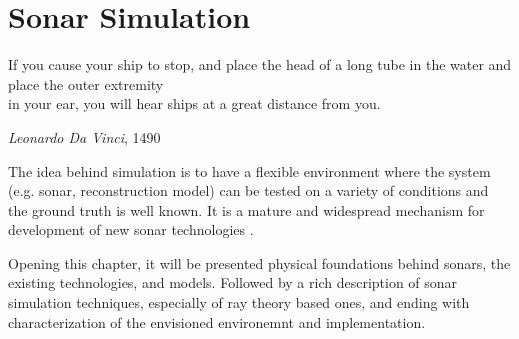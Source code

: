 \chapter{Sonar Simulation}

\epigraph{If you cause your ship to stop, and place the head of a long tube in
the water and place the outer extremity\\ in your ear, you will hear ships at a
great distance from you.}{\textit{Leonardo Da Vinci}, 1490}


The idea behind simulation is to have a flexible environment where the system
(e.g. sonar, reconstruction model) can be tested on a variety of conditions
and the ground truth is well known. It is a mature and widespread
mechanism for development of new sonar technologies \cite{Etter2013}.

Opening this chapter, it will be presented physical foundations behind sonars,
the existing technologies, and models. Followed by a rich description of
sonar simulation techniques, especially of ray theory based ones, and ending
with characterization of the envisioned environemnt and implementation.






